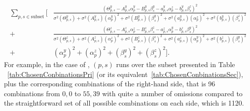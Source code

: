 \begin{equation}
  \label{eq:LeastSquareSolutionRICH}
  \begin{aligned}
    \displaystyle\sum_{p,s \in \mathrm{subset}}
      \bigg[ 
             &  \frac{(\varTheta^y_{p,s}  -          A^y_{p,s}  \alpha^y_p
                                          -          B^y_{p,s}   \beta^y_s
                                          -          a^y_{p,s}  \alpha^z_p
                                          -          b^y_{p,s}   \beta^z_s)^2}
             {\sigma^2(\varTheta^y_{p,s}) + \sigma^2(A^y_{p,s})(\alpha^y_p)^2
                                          + \sigma^2(B^y_{p,s})( \beta^y_s)^2
                                          + \sigma^2(a^y_{p,s})(\alpha^z_p)^2
                                          + \sigma^2(b^y_{p,s})( \beta^z_s)^2} \\
           + &  \frac{(\varTheta^z_{p,s}  -          A^z_{p,s}  \alpha^z_p
                                          -          B^z_{p,s}   \beta^z_s
                                          -          a^z_{p,s}  \alpha^y_p
                                          -          b^z_{p,s}   \beta^y_s)^2}
             {\sigma^2(\varTheta^z_{p,s}) + \sigma^2(A^z_{p,s})(\alpha^z_p)^2
                                          + \sigma^2(B^z_{p,s})( \beta^z_s)^2
                                          + \sigma^2(a^z_{p,s})(\alpha^y_p)^2
                                          + \sigma^2(b^z_{p,s})( \beta^y_s)^2} \\
           + & (\alpha^y_p)^2 + (\alpha^z_p)^2 + (\beta^y_s)^2+ (\beta^z_s)^2
      \bigg]
      .
  \end{aligned}
\end{equation}
For example, in the case of \richtwo, $(p,s)$ runs over the subset presented in
Table
~\ref{tab:ChosenConbinationsPri} (or its
equivalent~\ref{tab:ChosenConbinationsSec}), plus the corresponding combinations
of the right-hand side, that is 96 combinations from $0,0$ to $55,39$ with quite
a number of omissions compared to the straightforward set of all possible
combinations on each side, which is 1120.


